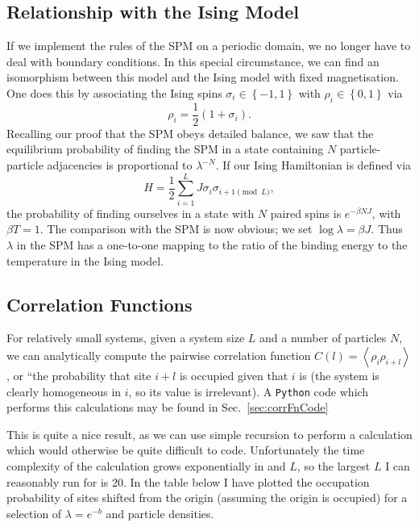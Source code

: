 \subsection{Relationship with the Ising Model} \label{sec:isingSim}
If we implement the rules of the SPM on a periodic domain, we no longer have to deal with boundary conditions. In this special circumstance, we can find an isomorphism between this model and the Ising model with fixed magnetisation.
One does this by associating the Ising spins $\sigma_i \in \left\{-1, 1 \right\}$ with $\rho_i \in \left\{ 0, 1 \right\}$ via
\begin{equation}
 \rho_i = \frac{1}{2}\left(1+\sigma_i\right).
\end{equation}
Recalling our proof that the SPM obeys detailed balance, we saw that the equilibrium probability of finding the SPM in a state containing $N$ particle-particle adjacencies is proportional to 
$\lambda^{-N}$.
If our Ising Hamiltonian is defined via
\begin{equation}
 H = \frac{1}{2} \sum_{i=1}^L J \sigma_i \sigma_{i+1 \pmod L},
\end{equation}
the probability of finding ourselves in a state with $N$ paired spins is $e^{-\beta N J}$, with $\beta T =1$. The comparison with the SPM is now obvious; we set $\log{\lambda} = \beta J$. Thus $\lambda$ in the SPM has a one-to-one mapping to the ratio of the binding energy to the temperature in the Ising model.


\subsection{Correlation Functions}
For relatively small systems, given a system size $L$ and a number of particles $N$, we can analytically compute the pairwise correlation function $C(l) = \left\langle \rho_i \rho_{i+l} \right\rangle$, or ``the probability that site $i+l$
is occupied given that $i$ is (the system is clearly homogeneous in $i$, so its value is irrelevant).
A \texttt{Python} code which performs this calculations may be found in Sec.~\ref{sec:corrFnCode}


This is quite a nice result, as we can use simple recursion to perform a calculation which would otherwise be quite difficult to code.
Unfortunately the time complexity of the calculation grows exponentially in and $L$, so the largest 
$L$ I can reasonably run for is $20$. In the table below I have plotted the occupation probability of sites shifted from the origin
(assuming the origin is occupied)  for a selection of $\lambda = e^{-b}$ and particle densities.


